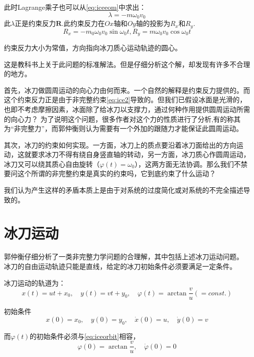\documentclass{ctexart}
\begin{document}
此时Lagrange乘子也可以从\eqref{eq:iceeom}中求出：
\begin{equation}
  \label{eq:icel}
 \lambda = -m\omega_0v_0
\end{equation}
此$\lambda$正是约束反力$\mathbf{R}$.此约束反力在$Ox$轴和$Oy$轴的投影为$R_x$和$R_y$.
\begin{equation}
  \label{eq:icecon}
  R_x = -m_0\omega_0v_0\sin\omega_0t, R_y = m \omega_0v_0\cos\omega_0t
\end{equation}

约束反力大小为常值，方向指向冰刀质心运动轨迹的圆心。

这是教科书上关于此问题的标准解法。但是仔细分析这个解，却发现有许多不合理的地方。

首先，冰刀做圆周运动的向心力由何而来。一个自然的解释是约束反力提供的。而这个约束反力正是由于非完整约束\eqref{eq:ice2}导致的。但我们已假设冰面是光滑的，也即不考虑摩擦因素，冰面除了给冰刀以支撑力，通过何种作用提供圆周运动所需的向心力？
为了说明这个问题，很多作者对这个力的性质进行了分析,有的称其为“非完整力”，而郭仲衡则认为需要有一个外加的跟随力才能保证此圆周运动。

其次，冰刀的约束如何实现。一方面，冰刀上的质点要沿着冰刀面给出的方向运动，这就要求冰刀不得有绕自身竖直轴的转动，另一方面，冰刀质心作圆周运动，冰刀又可以绕其质心自由旋转（$\varphi(t)=\omega_0$），这两方面无法协调。那么我们不禁要问这个所谓的非完整约束是真实的约束吗，它到底约束了什么运动？


我们认为产生这样的矛盾本质上是由于对系统的过度简化或对系统的不完全描述导致的。

\section{冰刀运动}
\label{sec:ice}


郭仲衡仔细分析了一类非完整力学问题的合理解，其中包括上述冰刀运动问题。
冰刀的自由运动轨迹只能是直线，给定的冰刀初始条件必须要满足一定条件。

冰刀运动的轨道为：
\begin{equation}
  \label{eq:iceorbit}
  x(t) = u t +x_0,\quad y(t) = v t + y_0,\quad \varphi (t) = \arctan \frac{v}{u}(= const.)
\end{equation}

初始条件
\begin{equation}
  \label{eq:initial}
  x(0) = x_0,\quad y(0) = y_0,\quad \dot{x}(0) = u,\quad \dot{y}(0) = v
\end{equation}

而$\varphi(t)$的初始条件必须与\eqref{eq:iceorbit}相容，
\begin{equation}
  \label{eq:initial2}
  \varphi(0) = \arctan \frac{v}{u},\quad \dot{\varphi}(0) = 0
\end{equation}
\end{document}
